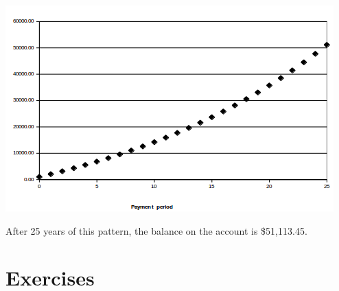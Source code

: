 \documentclass[notheorems
          ]
          {beamer}
\begin{document}
\begin{frame}
 \begin{center}
    
  \includegraphics[height=0.8\textheight ]{img/retirement_1.png}
 \end{center}

 
 \footnotesize{
 After 25 years of this pattern, the balance on the account is \$51,113.45. 
}
\end{frame}






\section{Exercises} 
\end{document}
